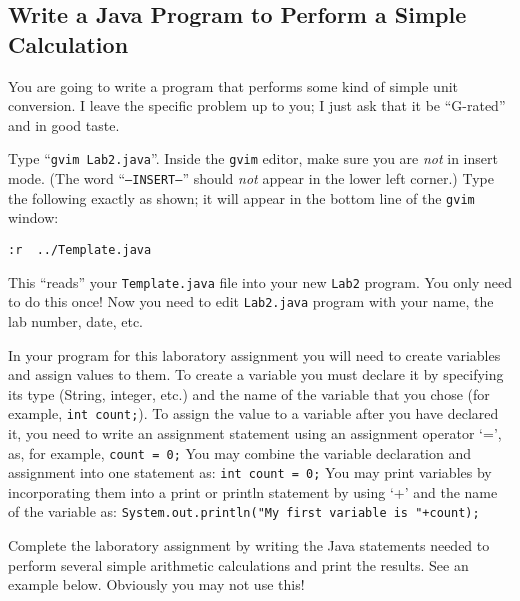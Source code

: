 \subsection*{Write a Java Program to Perform a Simple Calculation}
You are going to write a program that performs some kind of simple unit
conversion. I leave the specific problem up to you; I just ask that it be 
``G-rated'' and in good taste.

 Type ``{\tt gvim Lab2.java}''. Inside the
{\tt gvim} editor, make sure you are {\em not} in insert mode. (The word
``{\tt --INSERT--}'' should {\em not} appear in the lower left corner.) Type the
following exactly as shown; it will appear in the bottom line of the {\tt gvim}
window:
\begin{center}
\verb$:r  ../Template.java$
\end{center}
This ``reads'' your {\tt Template.java} file into your new {\tt Lab2} program.
You only need to do this once!  Now you need to edit {\tt Lab2.java} program with your name, the lab number, date, etc.

\noindent In your program for this laboratory assignment you will need to create variables and assign values to them. To create a variable you must declare it by specifying its type (String, integer, etc.) and the name of the variable that you chose (for example, {\tt int count;}). 
To assign the value to a variable after you have declared it, you need to write an assignment statement using an assignment operator `=', as, for example, {\tt count  = 0;} 
You may combine the variable declaration and assignment into one statement as: 
{\tt int count = 0;} 
You may print variables by incorporating them into a print or println statement by using `+' and the name of the variable as: {\tt System.out.println("My first variable is "+count);} 

 Complete the laboratory assignment by writing the Java statements needed to perform several simple
arithmetic calculations and print the results. See an example below. Obviously you may not use this!

